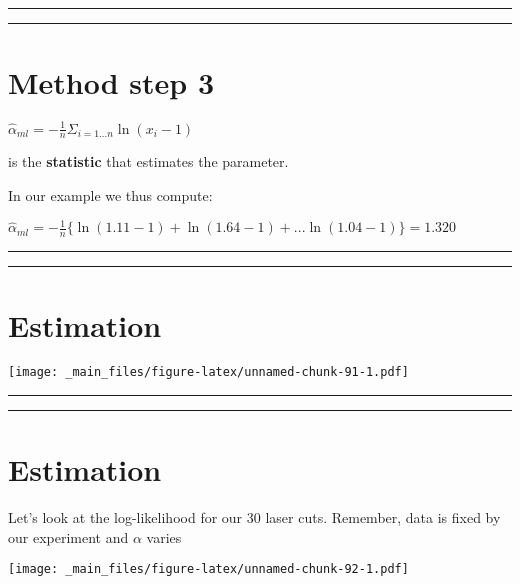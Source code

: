 \documentclass[
]{book}
\begin{document}
\begin{center}\rule{0.5\linewidth}{0.5pt}\end{center}

\begin{center}\rule{0.5\linewidth}{0.5pt}\end{center}

\hypertarget{method-step-3-1}{%
\section{Method step 3}\label{method-step-3-1}}

\(\hat{\alpha}_{ml}=-\frac{1}{n}\Sigma_{i=1...n} \ln (x_i-1)\)

is the \textbf{statistic} that estimates the parameter.

In our example we thus compute:

\(\hat{\alpha}_{ml}=-\frac{1}{n}\{ \ln (1.11-1)+ \ln (1.64-1)+...\ln (1.04-1)\}=1.320\)

\begin{center}\rule{0.5\linewidth}{0.5pt}\end{center}

\begin{center}\rule{0.5\linewidth}{0.5pt}\end{center}

\hypertarget{estimation-1}{%
\section{Estimation}\label{estimation-1}}

\texttt{[image: \_main\_files/figure-latex/unnamed-chunk-91-1.pdf]}

\begin{center}\rule{0.5\linewidth}{0.5pt}\end{center}

\begin{center}\rule{0.5\linewidth}{0.5pt}\end{center}

\hypertarget{estimation-2}{%
\section{Estimation}\label{estimation-2}}

Let's look at the log-likelihood for our \(30\) laser cuts. Remember, data is fixed by our experiment and \(\alpha\) varies

\texttt{[image: \_main\_files/figure-latex/unnamed-chunk-92-1.pdf]}
\end{document}

